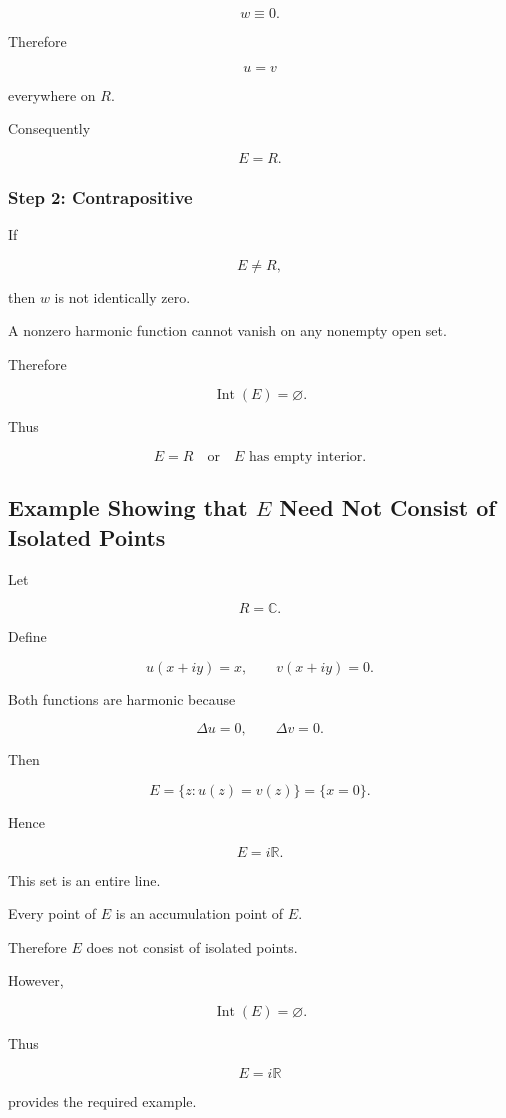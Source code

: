 \documentclass[12pt,a4paper]{article}
\theoremstyle{notespace}
\begin{document}
\[
w\equiv0.
\]

Therefore

\[
u=v
\]

everywhere on \(R\).

Consequently

\[
E=R.
\]

\subsubsection*{Step 2: Contrapositive}

If

\[
E\neq R,
\]

then \(w\) is not identically zero.

A nonzero harmonic function cannot vanish on any nonempty open set.

Therefore

\[
\operatorname{Int}(E)=\varnothing.
\]

Thus

\[
\boxed{
	E=R
	\quad\text{or}\quad
	E\text{ has empty interior.}
}
\]

\subsection*{Example Showing that \(E\) Need Not Consist of Isolated Points}

Let

\[
R=\mathbb C.
\]

Define

\[
u(x+iy)=x,
\qquad
v(x+iy)=0.
\]

Both functions are harmonic because

\[
\Delta u=0,
\qquad
\Delta v=0.
\]

Then

\[
E
=
\{z:u(z)=v(z)\}
=
\{x=0\}.
\]

Hence

\[
E=i\mathbb R.
\]

This set is an entire line.

Every point of \(E\) is an accumulation point of \(E\).

Therefore \(E\) does not consist of isolated points.

However,

\[
\operatorname{Int}(E)=\varnothing.
\]

Thus

\[
\boxed{
	E=i\mathbb R
}
\]

provides the required example.
\end{document}
